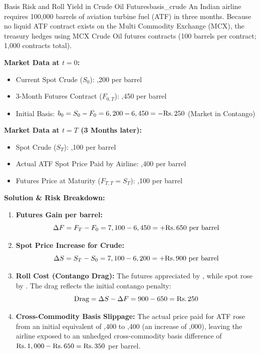 \begin{example}{Basis Risk and Roll Yield in Crude Oil Futures}{basis_crude}
An Indian airline requires 100,000 barrels of aviation turbine fuel (ATF) in three months. Because no liquid ATF contract exists on the Multi Commodity Exchange (MCX), the treasury hedges using MCX Crude Oil futures contracts (100 barrels per contract; 1,000 contracts total).

\textbf{Market Data at $t = 0$:}
\begin{itemize}[leftmargin=1.5em, noitemsep]
    \item Current Spot Crude ($S_0$): ,200 per barrel
    \item 3-Month Futures Contract ($F_{0,T}$): ,450 per barrel
    \item Initial Basis: $b_0 = S_0 - F_0 = 6,200 - 6,450 = -\text{Rs.}\, 250$ (Market in Contango)
\end{itemize}

\textbf{Market Data at $t = T$ (3 Months later):}
\begin{itemize}[leftmargin=1.5em, noitemsep]
    \item Spot Crude ($S_T$): ,100 per barrel
    \item Actual ATF Spot Price Paid by Airline: ,400 per barrel
    \item Futures Price at Maturity ($F_{T,T} = S_T$): ,100 per barrel
\end{itemize}

\textbf{Solution \& Risk Breakdown:}
\begin{enumerate}[leftmargin=1.2em, itemsep=2pt]
    \item \textbf{Futures Gain per barrel:}
    \[
    \Delta F = F_T - F_0 = 7,100 - 6,450 = +\text{Rs.}\, 650 \text{ per barrel}
    \]
    \item \textbf{Spot Price Increase for Crude:}
    \[
    \Delta S = S_T - S_0 = 7,100 - 6,200 = +\text{Rs.}\, 900 \text{ per barrel}
    \]
    \item \textbf{Roll Cost (Contango Drag):} The futures appreciated by , while spot rose by . The  drag reflects the initial contango penalty:
    \[
    \text{Drag} = \Delta S - \Delta F = 900 - 650 = \text{Rs.}\, 250
    \]
    \item \textbf{Cross-Commodity Basis Slippage:} The actual price paid for ATF rose from an initial equivalent of ,400 to ,400 (an increase of ,000), leaving the airline exposed to an unhedged cross-commodity basis difference of $\text{Rs.}\, 1,000 - \text{Rs.}\, 650 = \text{Rs.}\, 350$ per barrel.
\end{enumerate}
\end{example}

